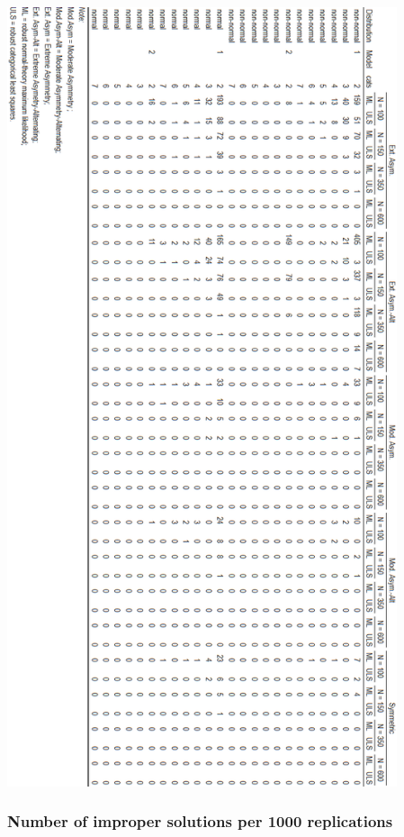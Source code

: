 \documentclass[10,a4paperpaper,]{article}
\begin{document}
\includegraphics[width=325pt]{./figures/tabA2_A3}

\subsubsection{Number of improper solutions per 1000 replications}
\end{document}
